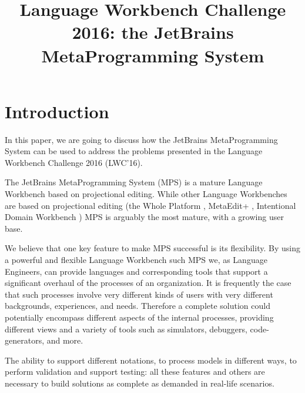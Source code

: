 \documentclass[preprint,numbers,10pt]{sigplanconf}
\begin{document}
\title{Language Workbench Challenge 2016: the JetBrains MetaProgramming System}


\maketitle

%
%

\section{Introduction}

In this paper, we are going to discuss how the JetBrains MetaProgramming System can be used to address the problems presented in the Language Workbench Challenge 2016 (LWC'16).

The JetBrains MetaProgramming System (MPS) is a mature Language Workbench based on projectional editing. While other Language Workbenches are based on projectional editing (the Whole Platform \cite{solmi2005whole}, MetaEdit+ \cite{Tolvanen2006}, Intentional Domain Workbench \cite{Simonyi2006}) MPS is arguably the most mature, with a growing user base.

We believe that one key feature to make MPS successful is its flexibility. By using a powerful and flexible Language Workbench such MPS we, as Language Engineers, can provide languages and corresponding tools that support a significant overhaul of the processes of an organization. It is frequently the case that such processes involve very different kinds of users with very different backgrounds, experiences, and needs. Therefore a complete solution could potentially encompass different aspects of the internal processes, providing different views and a variety of tools such as simulators, debuggers, code-generators, and more.

The ability to support different notations, to process models in different ways, to perform validation and support testing: all these features and others are necessary to build solutions as complete as demanded in real-life scenarios.
\end{document}
